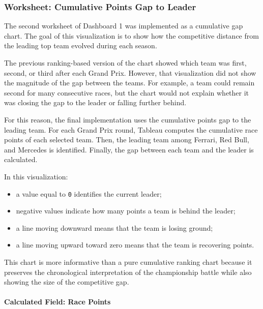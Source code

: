 \documentclass[12pt,a4paper]{article}
\begin{document}
	
	\subsubsection{Worksheet: Cumulative Points Gap to Leader}
	
	The second worksheet of Dashboard 1 was implemented as a cumulative gap chart.
	The goal of this visualization is to show how the competitive distance from the leading top team evolved during each season.
	
	The previous ranking-based version of the chart showed which team was first, second, or third after each Grand Prix.
	However, that visualization did not show the magnitude of the gap between the teams.
	For example, a team could remain second for many consecutive races, but the chart would not explain whether it was closing the gap to the leader or falling further behind.
	
	For this reason, the final implementation uses the cumulative points gap to the leading team.
	For each Grand Prix round, Tableau computes the cumulative race points of each selected team.
	Then, the leading team among Ferrari, Red Bull, and Mercedes is identified.
	Finally, the gap between each team and the leader is calculated.
	
	In this visualization:
	
	\begin{itemize}[leftmargin=1.2cm]
		\item a value equal to \texttt{0} identifies the current leader;
		\item negative values indicate how many points a team is behind the leader;
		\item a line moving downward means that the team is losing ground;
		\item a line moving upward toward zero means that the team is recovering points.
	\end{itemize}
	
	This chart is more informative than a pure cumulative ranking chart because it preserves the chronological interpretation of the championship battle while also showing the size of the competitive gap.
	
	\paragraph{Calculated Field: Race Points}
	
\end{document}
